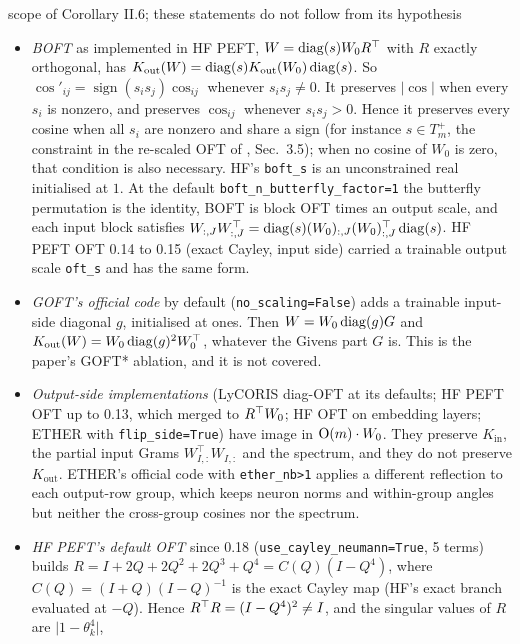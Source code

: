 \begin{remark*}{scope of Corollary II.6; these statements do not follow from its hypothesis}
\begin{itemize}
  \item \emph{BOFT} as implemented in HF PEFT, $W=\operatorname{diag}(s)W_0R^{\top}$ with $R$ exactly orthogonal, has
    $K_{\mathrm{out}}(W)=\operatorname{diag}(s)K_{\mathrm{out}}(W_0)\operatorname{diag}(s)$. So $\cos'_{ij}=\operatorname{sign}(s_is_j)\cos_{ij}$
    whenever $s_is_j\neq0$. It preserves $\lvert\cos\rvert$ when every $s_i$ is nonzero, and preserves $\cos_{ij}$
    whenever $s_is_j>0$. Hence it preserves every cosine when all $s_i$ are nonzero and share a sign (for instance
    $s\in T_m^+$, the constraint in the re-scaled OFT of \citet{qiu2023controlling}, Sec.~3.5); when no cosine of $W_0$
    is zero, that condition is also necessary. HF's \texttt{boft\_s} is an unconstrained real initialised at $1$. At the
    default \texttt{boft\_n\_\allowbreak butterfly\_factor=1} the butterfly permutation is the identity, BOFT is block OFT times an
    output scale, and each input block satisfies
    $W_{:,J}W_{:,J}^{\top}=\operatorname{diag}(s)(W_0)_{:,J}(W_0)_{:,J}^{\top}\operatorname{diag}(s)$. HF PEFT OFT 0.14 to 0.15 (exact Cayley, input
    side) carried a trainable output scale \texttt{oft\_s} and has the same form.
  \item \emph{GOFT's official code} by default (\texttt{no\_scaling=False}) adds a trainable input-side diagonal $g$,
    initialised at ones. Then $W=W_0\operatorname{diag}(g)G$ and $K_{\mathrm{out}}(W)=W_0\operatorname{diag}(g)^2W_0^{\top}$, whatever the Givens part $G$
    is. This is the paper's GOFT* ablation, and it is not covered.
  \item \emph{Output-side implementations} (LyCORIS diag-OFT at its defaults; HF PEFT OFT up to 0.13, which merged to
    $R^{\top} W_0$; HF OFT on embedding layers; ETHER with \texttt{flip\_side=True}) have image in $\mathrm{O}(m)\cdot W_0$. They
    preserve $K_{\mathrm{in}}$, the partial input Grams $W_{I,:}^{\top}W_{I,:}$ and the spectrum, and they do not
    preserve $K_{\mathrm{out}}$. ETHER's official code with \texttt{ether\_nb>1} applies a different reflection to each
    output-row group, which keeps neuron norms and within-group angles but neither the cross-group cosines nor the
    spectrum.
  \item \emph{HF PEFT's default OFT} since 0.18 (\texttt{use\_cayley\_\allowbreak neumann=True}, 5 terms) builds
    $R=I+2Q+2Q^2+2Q^3+Q^4=C(Q)(I-Q^4)$, where $C(Q)=(I+Q)(I-Q)^{-1}$ is the exact Cayley map (HF's exact branch
    evaluated at $-Q$). Hence $R^{\top} R=(I-Q^4)^2\ne I$, and the singular values of $R$ are $\lvert1-\theta_k^4\rvert$,

\end{itemize}
\end{remark*}
